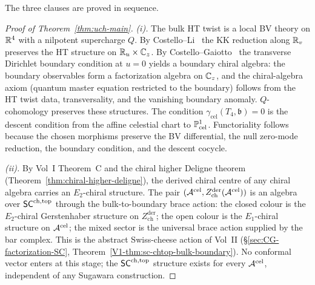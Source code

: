 The three clauses are proved in sequence.

\begin{proof}[Proof of Theorem~\ref{thm:uch-main}]
\emph{(i).}
The bulk HT twist is a local BV theory on $\mathbb R^4$ with a nilpotent
supercharge $Q$. By Costello--Li~\cite[Thm.~6.2]{CostelloLiTwistedSugra}
the KK reduction along $\mathbb R_v$ preserves the HT structure on $\mathbb R_u
\times \mathbb C_z$. By Costello--Gaiotto~\cite{CostelloGaiottoBoundaryVOA}
the transverse Dirichlet boundary condition at $u=0$ yields a
boundary chiral algebra: the boundary observables form a
factorization algebra on $\mathbb C_z$, and the chiral-algebra axiom
(quantum master equation restricted to the boundary) follows from
the HT twist data, transversality, and the vanishing
boundary anomaly. $Q$-cohomology preserves these structures. The
condition $\gamma_{\mathrm{cel}}(T_4,\mathfrak b)=0$ is the
descent condition from the affine celestial chart to
$\mathbb P^1_{\text{cel}}$. Functoriality follows because the chosen
morphisms preserve the BV differential, the null zero-mode reduction,
the boundary condition, and the descent cocycle.

\emph{(ii).}
By Vol~I Theorem~C and the chiral higher Deligne theorem
(Theorem~\ref{thm:chiral-higher-deligne}), the derived chiral centre
of any chiral algebra carries an $E_2$-chiral structure. The pair
$(\mathcal A^{\mathrm{cel}}, Z^{\mathrm{der}}_{\mathrm{ch}}(\mathcal A^{\mathrm{cel}}))$
is an algebra over $\mathsf{SC}^{\mathrm{ch,top}}$ through the bulk-to-boundary brace action:
the closed colour is the $E_2$-chiral Gerstenhaber structure on
$Z^{\mathrm{der}}_{\mathrm{ch}}$; the open colour is the $E_1$-chiral
structure on $\mathcal A^{\mathrm{cel}}$; the mixed sector is the universal
brace action supplied by the bar complex. This is the abstract
Swiss-cheese action of Vol~II
(\S\ref{sec:CG-factorization-SC}, Theorem~\ref{V1-thm:sc-chtop-bulk-boundary}).
No conformal vector enters at this stage; the $\mathsf{SC}^{\mathrm{ch,top}}$ structure
exists for every $\mathcal A^{\mathrm{cel}}$, independent of any Sugawara construction.


\end{proof}
